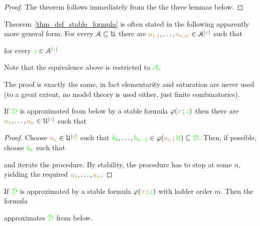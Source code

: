\documentclass[creche.tex]{subfiles}
\begin{document}
\begin{proof}
The theorem follows immediately from the the three lemmas below.
\end{proof}

\begin{remark}
Theorem~\ref{thm_def_stable_formula} is often stated in the following  apparently more general form.
For every $\EuScript A\subseteq\EuScript U$ there are ${\color{brown} a_{1,1}},\dots,{\color{brown} a_{n,m}}\in \EuScript A^{|{\color{brown} x}|}$ such that

\hfill for every ${\color{green} z}\in\EuScript A^{|{\color{green} z}|}$ 

Note that the equivalence above is restricted to ${\color{green}\EuScript A}$.

The proof is exactly the same, in fact elementarity and saturation are never used (to a great extent, no model theory is used either, just finite combinatorics).\QED
\end{remark}


\begin{lemma}
If ${\color{green}\EuScript D}$ is approximated from below by a stable formula $\varphi({\color{brown} x}\,;{\color{green} z})$ then there are ${\color{brown} a_1},\dots,{\color{brown} a_n}\in\EuScript U^{|{\color{brown} x}|}$ such that 


\end{lemma}

\begin{proof}
Choose ${\color{brown} a_n}\in\EuScript U^{|{\color{brown} x}|}$ such that ${\color{green} b_0},\dots,{\color{green} b_{n-1}}\in\varphi({\color{brown} a_n}\,;{\color{green}\EuScript U})\subseteq{\color{green}\EuScript D}$.
Then, if possible, choose ${\color{green} b_n}$ such that


and iterate the procedure.
By stability, the procedure has to stop at some $n$, yielding the required  ${\color{brown} a_1},\dots,{\color{brown} a_n}$.
\end{proof}


\begin{lemma}
If ${\color{green}\EuScript D}$ is approximated by a stable formula $\varphi({\color{brown} x}\,;{\color{green} z})$ with ladder order $m$.
Then the formula 


approximates ${\color{green}\EuScript D}$ from below.
\end{lemma}
\end{document}
